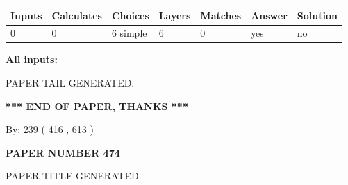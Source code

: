 \documentclass[12pt]{article}
\begin{document}
   
   
   
\noindent\begin{tabular}{|l|l|l|l|l|l|l|}
 \hline
Inputs & Calculates & Choices & Layers & Matches & Answer & Solution \\ \hline
 0  & 
 0  & 
 6
  simple  
  & 
 6  & 
 0  & 
  yes & 
  no 
  \\ \hline
 \end{tabular}
   
   
   
   
\noindent{}
   
   
   
   
\noindent\vspace{0.1in}\hspace{-0.08in} {\textbf{\Large{All inputs: }}}
   
   
   
   
   
   
 \vspace{0.2in}
 
   
   
\vspace{2.0in} PAPER TAIL GENERATED.
   
   
   
   
\vspace{1.0in} 
{\textbf{\large{ *** END OF PAPER, THANKS *** }}} 
   
   
\hspace{1.0in} By: 
 239 ( 416 ,  613 )
   
   
   
   
\newpage 
\setcounter{page}{ 
   474001 } 
   
   
   
   
 {\textbf{ \Large{ PAPER NUMBER  474  }}}
   
   
\vspace{0.2in}
   
   
   
   
   
   
   
   
 \vspace{0.2in}
 
 
 
 
   
   
 PAPER TITLE GENERATED.
   
   
   
\end{document}
